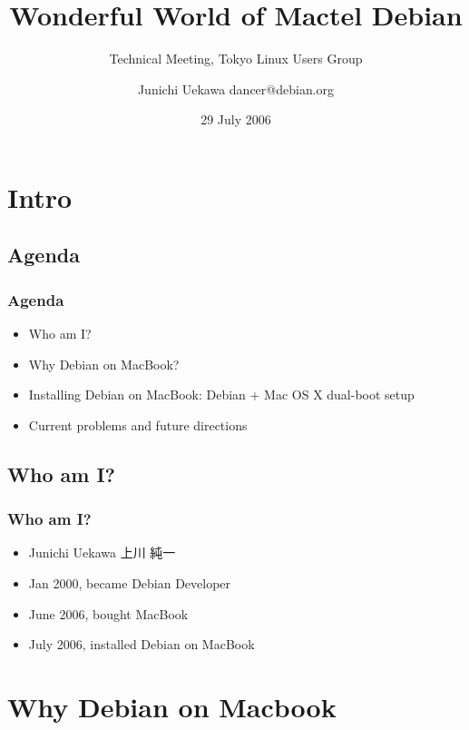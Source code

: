 \documentclass[cjk,dvipdfmx]{beamer}
\title{Wonderful World of Mactel Debian }
\subtitle{Technical Meeting, Tokyo Linux Users Group}
\author{Junichi Uekawa dancer@debian.org}
\date{29 July 2006}
\begin{document}
\frame{\titlepage{}}



\section{Intro}
\subsection{Agenda}

\begin{frame}
\frametitle{Agenda}
\begin{itemize}
 \item Who am I?
 \item Why Debian on MacBook?
 \item Installing Debian on MacBook: Debian + Mac OS X dual-boot setup
 \item Current problems and future directions
\end{itemize}
\end{frame}

\subsection{Who am I?}
\begin{frame}
\frametitle{Who am I?}
 \begin{itemize}[<+->]
 \item Junichi Uekawa 上川 純一
 \item Jan 2000, became Debian Developer
 \item June 2006, bought MacBook
 \item July 2006, installed Debian on MacBook
 \end{itemize}
\end{frame}

\section{Why Debian on Macbook}
\end{document}
